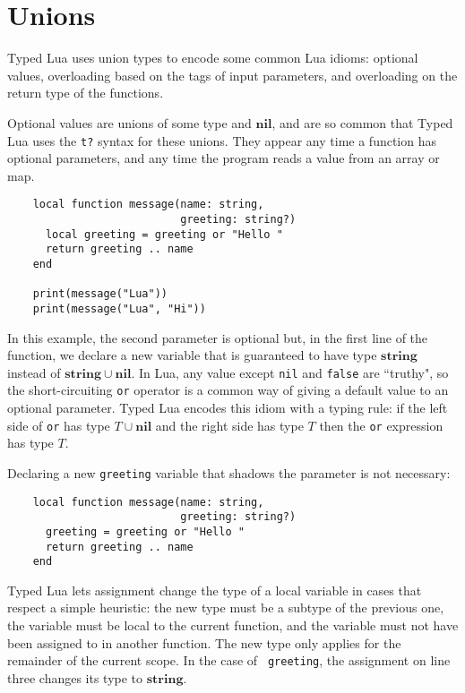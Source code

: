 \documentclass[preprint]{sig-alternate}
\newcommand{\Nil}{\mathbf{nil}}
\newcommand{\String}{\mathbf{string}}
\begin{document}
\section{Unions}
\label{sec:unions}

Typed Lua uses union types to encode some common Lua idioms:
optional values, overloading based on the tags of input parameters,
and overloading on the return type of the functions.

Optional values are unions of some type and $\Nil$, and are so
common that Typed Lua uses the {\tt t?} syntax for these unions.
They appear any time a function has optional parameters, and
any time the program reads a value from an array or map.

\begin{verbatim}
    local function message(name: string,
                           greeting: string?)
      local greeting = greeting or "Hello "
      return greeting .. name
    end
    
    print(message("Lua"))
    print(message("Lua", "Hi"))
\end{verbatim}

In this example, the second parameter is optional but, in the
first line of the function, we declare a new variable that is
guaranteed to have type $\String$ instead of $\String \cup \Nil$.
In Lua, any value except {\tt nil} and {\tt false} are ``truthy",
so the short-circuiting {\tt or} operator is a common way of
giving a default value to an optional parameter. Typed Lua
encodes this idiom with a typing rule: if
the left side of {\tt or} has type $T \cup \Nil$ and the right side has type $T$ then the {\tt or} expression has type $T$.

Declaring a new {\tt greeting} variable that shadows the
parameter is not necessary:

\begin{verbatim}
    local function message(name: string, 
                           greeting: string?)
      greeting = greeting or "Hello "
      return greeting .. name
    end
\end{verbatim}

Typed Lua lets assignment change the type of a local variable in
cases that respect a simple heuristic: the new type must be a
subtype of the previous one, the variable must be local
to the current function, and the variable must not have been
assigned to in another function. The new type only applies for
the remainder of the current scope. In the case of {\tt
greeting}, the assignment on line three changes its type to
$\String$.
\end{document}
